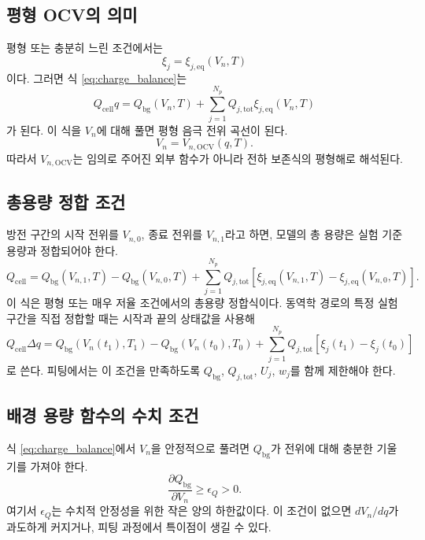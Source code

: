 \documentclass[11pt,a4paper]{article}
\newcommand{\OCV}{\mathrm{OCV}}
\newcommand{\bg}{\mathrm{bg}}
\newcommand{\cell}{\mathrm{cell}}
\newcommand{\tot}{\mathrm{tot}}
\begin{document}
\subsection{평형 OCV의 의미}
평형 또는 충분히 느린 조건에서는
\begin{equation}
\xi_j=\xi_{j,\mathrm{eq}}(V_n,T)
\end{equation}
이다. 그러면 식 \eqref{eq:charge_balance}는
\begin{equation}
Q_{\cell}q=Q_{\bg}(V_n,T)+\sum_{j=1}^{N_p}Q_{j,\tot}\xi_{j,\mathrm{eq}}(V_n,T)
\label{eq:ocv_implicit}
\end{equation}
가 된다. 이 식을 \(V_n\)에 대해 풀면 평형 음극 전위 곡선이 된다.
\begin{equation}
V_n=V_{n,\OCV}(q,T).
\end{equation}
따라서 \(V_{n,\OCV}\)는 임의로 주어진 외부 함수가 아니라 전하 보존식의 평형해로 해석된다.

\subsection{총용량 정합 조건}
방전 구간의 시작 전위를 \(V_{n,0}\), 종료 전위를 \(V_{n,1}\)라고 하면, 모델의 총 용량은 실험 기준 용량과 정합되어야 한다.
\begin{equation}
Q_{\cell}=Q_{\bg}(V_{n,1},T)-Q_{\bg}(V_{n,0},T)+\sum_{j=1}^{N_p}Q_{j,\tot}\left[\xi_{j,\mathrm{eq}}(V_{n,1},T)-\xi_{j,\mathrm{eq}}(V_{n,0},T)\right].
\label{eq:capacity_consistency}
\end{equation}
이 식은 평형 또는 매우 저율 조건에서의 총용량 정합식이다. 동역학 경로의 특정 실험 구간을 직접 정합할 때는 시작과 끝의 상태값을 사용해
\begin{equation}
Q_{\cell}\Delta q=Q_{\bg}(V_n(t_1),T_1)-Q_{\bg}(V_n(t_0),T_0)+\sum_{j=1}^{N_p}Q_{j,\tot}\left[\xi_j(t_1)-\xi_j(t_0)\right]
\end{equation}
로 쓴다. 피팅에서는 이 조건을 만족하도록 \(Q_{\bg}\), \(Q_{j,\tot}\), \(U_j\), \(w_j\)를 함께 제한해야 한다.

\subsection{배경 용량 함수의 수치 조건}
식 \eqref{eq:charge_balance}에서 \(V_n\)을 안정적으로 풀려면 \(Q_{\bg}\)가 전위에 대해 충분한 기울기를 가져야 한다.
\begin{equation}
\frac{\partial Q_{\bg}}{\partial V_n}\ge \epsilon_Q>0.
\label{eq:bg_slope_floor}
\end{equation}
여기서 \(\epsilon_Q\)는 수치적 안정성을 위한 작은 양의 하한값이다. 이 조건이 없으면 \(dV_n/dq\)가 과도하게 커지거나, 피팅 과정에서 특이점이 생길 수 있다.
\end{document}
